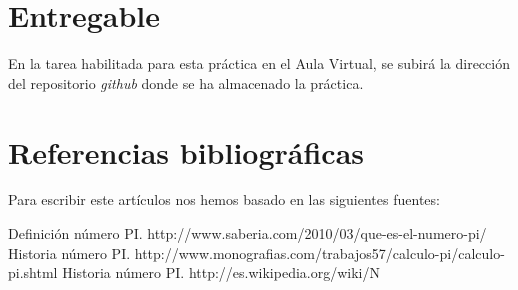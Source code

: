 \documentclass[spanish,a4paper,10pt]{article}
\begin{document}
\section{Entregable}
En la tarea habilitada para esta práctica en el Aula Virtual, se subirá
la dirección del repositorio \textit{github} donde se ha almacenado la práctica.

\section{Referencias bibliográficas}
Para escribir este artículos nos hemos basado en las siguientes fuentes:

\begin{thebibliography}{2}
 Definición número PI. http://www.saberia.com/2010/03/que-es-el-numero-pi/
 Historia número PI. http://www.monografias.com/trabajos57/calculo-pi/calculo-pi.shtml
 Historia número PI. http://es.wikipedia.org/wiki/N
\end{thebibliography}
\end{document}
